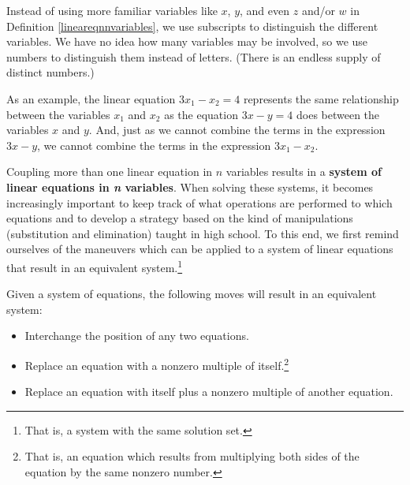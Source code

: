 \documentclass{ximera}
\begin{document}

 

Instead of using more familiar variables like $x$, $y$, and even $z$ and/or $w$ in Definition \ref{lineareqnnvariables}, we use subscripts to distinguish the different variables.  We have no idea how many variables may be involved, so we use numbers to distinguish them instead of letters.  (There is an endless supply of distinct numbers.)  

As an example, the linear equation $3x_1 - x_2 = 4$ represents the same relationship between the variables $x_1$ and $x_2$  as the equation $3x-y=4$ does between the variables $x$ and $y$.  And, just as we cannot combine the terms in the expression $3x-y$, we cannot combine the terms in the expression $3x_1 - x_2$.  

Coupling more than one linear equation in $n$ variables results in a \textbf{system of linear equations in \textit{n} variables}.  When solving these systems, it becomes increasingly important to keep track of what operations are performed to which equations and to develop a strategy based on the kind of manipulations (substitution and elimination) taught in high school.  To this end, we first remind ourselves of the maneuvers which can be applied to a system of linear equations that result in an equivalent system.\footnote{That is, a system with the same solution set.}  

 


\begin{theorem}  \label{equationmoves} Given a system of equations, the following moves will result in an equivalent system:

\begin{itemize}

\item  Interchange the position of any two equations.

\item  Replace an equation with a nonzero multiple of itself.\footnote{That is, an equation which results from multiplying both sides of the equation by the same nonzero number.}

\item  Replace an equation with itself plus a nonzero multiple of another equation.


\end{itemize}

\end{theorem}  
\end{document}
